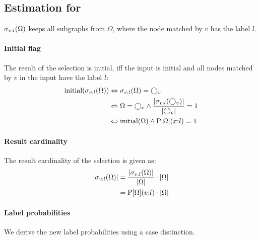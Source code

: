 \subsection{Estimation for }

$\sigma_{v:l}(\Omega)$ keeps all subgraphs from $\Omega$, where the node
matched by $v$ has the label $l$.

\paragraph{Initial flag}

The result of the selection is initial, iff the input is initial and all
nodes matched by $v$ in the input have the label $l$:
\begin{align}
\begin{split}
  \textnormal{initial}(\sigma_{v:l}(\Omega))
    &\Leftrightarrow \sigma_{v:l}(\Omega) = \bigcirc_{v} \\
    &\Leftrightarrow \Omega = \bigcirc_{v} \land
      \frac{{\left \vert \sigma_{v:l}(\bigcirc_{v}) \right \vert}}
           {{\left \vert \bigcirc_{v} \right \vert}} = 1 \\
    &\Leftrightarrow \textnormal{initial}(\Omega) \land
      \operatorname{P}[\Omega](x{:}l) = 1
\end{split}
\end{align}

\paragraph{Result cardinality}

The result cardinality of the selection is given as:
\begin{align}
\begin{split}
  {\left \vert \sigma_{v:l}(\Omega) \right \vert} &= \frac{{\left \vert \sigma_{v:l}(\Omega) \right \vert}}
                                         {{\left \vert \Omega \right \vert}}
                                    \cdot {\left \vert \Omega \right \vert} \\
                                 &= \operatorname{P}[\Omega](v{:}l) \cdot {\left \vert \Omega \right \vert}
\end{split}
\end{align}

\paragraph{Label probabilities}

We derive the new label probabilities using a case distinction.

